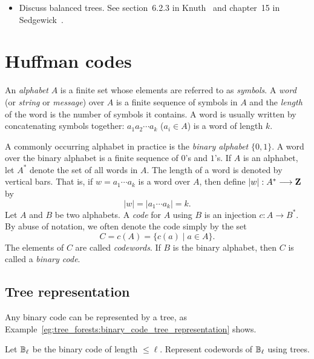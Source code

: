 {\color{red}
\begin{itemize}
\item Discuss balanced trees. See section~6.2.3 in
  Knuth~\cite{Knuth1998c} and chapter~15 in Sedgewick~\cite{Sedgewick1990}.
\end{itemize}
}



\section{Huffman codes}
\label{sec:trees_forests:Huffman_codes}

An \emph{alphabet} $A$ is a finite set whose elements
are referred to as \emph{symbols}. A \emph{word} (or
\emph{string} or \emph{message}) over $A$
is a finite sequence of symbols in $A$ and the \emph{length} of the
word is the number of symbols it contains. A word is usually written
by concatenating symbols together: $a_1 a_2 \cdots a_k$ ($a_i \in A$)
is a word of length $k$.

A commonly occurring alphabet in practice is the \emph{binary alphabet}
$\{0,1\}$. A word over the binary alphabet is a finite sequence of
$0$'s and $1$'s. If $A$ is an alphabet, let $A^*$ denote the set of
all words in $A$. The length of a word is denoted by vertical
bars. That is, if $w = a_1 \cdots a_k$ is a word over $A$, then define
$|w|: A^* \longrightarrow \mathbf{Z}$ by
\[
|w|
=
|a_1 \cdots a_k|
=
k.
\]
Let $A$ and $B$ be two alphabets. A \emph{code} for $A$
using $B$ is an injection $c: A \to B^*$. By abuse of
notation, we often denote the code simply by the set
\[
C
=
c(A)
=
\{c(a) \;|\; a \in A\}.
\]
The elements of $C$ are called \emph{codewords}. If
$B$ is the binary alphabet, then $C$ is called a
\emph{binary code}.



\subsection{Tree representation}

Any binary code can be represented by a tree, as
Example~\ref{eg:tree_forests:binary_code_tree_representation} shows.

\begin{example}
\label{eg:tree_forests:binary_code_tree_representation}
Let $\mathbb{B}_\ell$ be the binary code of length $\leq \ell$. Represent
codewords of $\mathbb{B}_\ell$ using trees.
\end{example}

